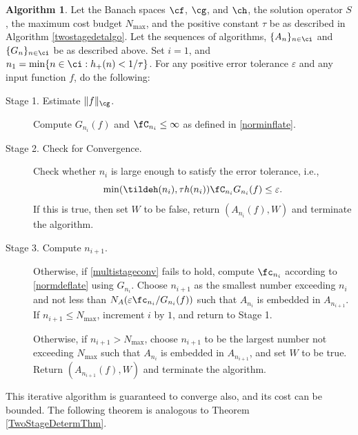 \documentclass[]{elsarticle}
\theoremstyle{definition}
\newtheorem{algo}{Algorithm}
\theoremstyle{remark}
\begin{document}
\begin{algo} \label{multistagealgo}  Let the Banach spaces $\cf$, $\cg$, and $\ch$, the solution operator $S$, the maximum cost budget $N_{\max}$, and the positive constant $\tau$ be as described in Algorithm \ref{twostagedetalgo}. Let the sequences of algorithms, $\{A_n\}_{n \in \ci}$ and  $\{G_n\}_{n \in \ci}$ be as described above.  Set $i=1$, and $n_1 = \min\{ n \in \ci : h_+(n) < 1/\tau\}$. For any positive error tolerance $\varepsilon$ and any input function $f$, do the following:
\begin{description}

\item [Stage 1. Estimate $\| f \| _{\cg}$.] Compute $G_{n_i}(f)$ and $\fC_{n_i} \le \infty$ as defined in \eqref{norminflate}.  

\item [Stage 2. Check for Convergence.] Check whether $n_i$ is large enough to satisfy the error tolerance, i.e., 
\begin{equation} \label{multistageconv}
\min(\tildeh(n_i),\tau h(n_i))\fC_{n_i} G_{n_i}(f) \le \varepsilon.
\end{equation}
If this is true, then set $W$ to be false, return $(A_{n_i}(f),W)$ and terminate the algorithm.

\item[Stage 3. Compute $n_{i+1}$.]  Otherwise, if \eqref{multistageconv} fails to hold, compute $\fc_{n_i}$ according to \eqref{normdeflate} using $G_{n_i}$. Choose $n_{i+1}$ as the smallest number exceeding $n_i$ and not less than $N_{A}(\varepsilon \fc_{n_i}/G_{n_i}(f))$ such that $A_{n_{i}}$ is embedded in $A_{n_{i+1}}$. If $n_{i+1} \le N_{\max}$, increment $i$ by $1$, and return to Stage 1.  

Otherwise, if $n_{i+1} > N_{\max}$, choose $n_{i+1}$ to be the largest number not exceeding $N_{\max}$ such that $A_{n_{i}}$ is embedded in $A_{n_{i+1}}$, and set $W$ to be true. Return $(A_{n_{i+1}}(f),W)$ and terminate the algorithm.
\end{description}  
\end{algo}

This iterative algorithm is guaranteed to converge also, and its cost can be bounded.  The following theorem is analogous to Theorem \ref{TwoStageDetermThm}.
\end{document}
